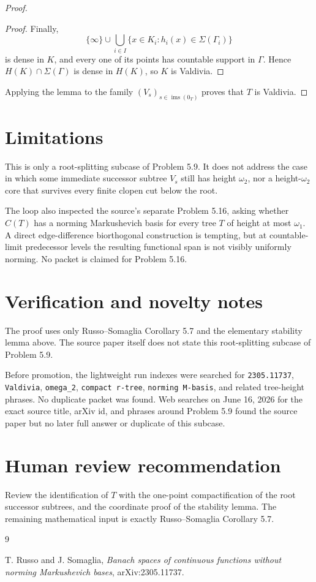 \documentclass[11pt]{article}
\newcommand{\ims}{\operatorname{ims}}
\begin{document}
\begin{proof}
\begin{proof}
Finally,
\[
  \{\infty\}\cup\bigcup_{i\in I}
  \{x\in K_i:h_i(x)\in\Sigma(\Gamma_i)\}
\]
is dense in \(K\), and every one of its points has countable support in
\(\Gamma\). Hence \(H(K)\cap\Sigma(\Gamma)\) is dense in \(H(K)\), so \(K\) is
Valdivia.
\end{proof}

Applying the lemma to the family \((V_s)_{s\in\ims(0_T)}\) proves that \(T\)
is Valdivia.
\end{proof}

\section*{Limitations}

This is only a root-splitting subcase of Problem 5.9. It does not address the
case in which some immediate successor subtree \(V_s\) still has height
\(\omega_2\), nor a height-\(\omega_2\) core that survives every finite
clopen cut below the root.

The loop also inspected the source's separate Problem 5.16, asking whether
\(C(T)\) has a norming Markushevich basis for every tree \(T\) of height at
most \(\omega_1\). A direct edge-difference biorthogonal construction is
tempting, but at countable-limit predecessor levels the resulting functional
span is not visibly uniformly norming. No packet is claimed for Problem 5.16.

\section*{Verification and novelty notes}

The proof uses only Russo--Somaglia Corollary 5.7 and the elementary stability
lemma above. The source paper itself does not state this root-splitting
subcase of Problem 5.9.

Before promotion, the lightweight run indexes were searched for
\texttt{2305.11737}, \texttt{Valdivia}, \texttt{omega\_2},
\texttt{compact r-tree}, \texttt{norming M-basis}, and related tree-height
phrases. No duplicate packet was found. Web searches on June 16, 2026 for
the exact source title, arXiv id, and phrases around Problem 5.9 found the
source paper but no later full answer or duplicate of this subcase.

\section*{Human review recommendation}

Review the identification of \(T\) with the one-point compactification of the
root successor subtrees, and the coordinate proof of the stability lemma. The
remaining mathematical input is exactly Russo--Somaglia Corollary 5.7.

\begin{thebibliography}{9}

T. Russo and J. Somaglia,
\emph{Banach spaces of continuous functions without norming Markushevich
bases},
arXiv:2305.11737.

\end{thebibliography}
\end{document}
